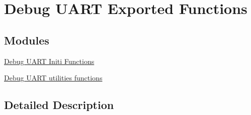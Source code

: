 \hypertarget{group___debug___uart___exported___functions}{}\section{Debug U\+A\+RT Exported Functions}
\label{group___debug___uart___exported___functions}
\subsection*{Modules}
\begin{DoxyCompactItemize}
\item 
\hyperlink{group___debug___uart___exported___functions___group1}{Debug U\+A\+R\+T Initi Functions}
\item 
\hyperlink{group___debug___uart___exported___functions___group2}{Debug U\+A\+R\+T utilities functions}
\end{DoxyCompactItemize}


\subsection{Detailed Description}
